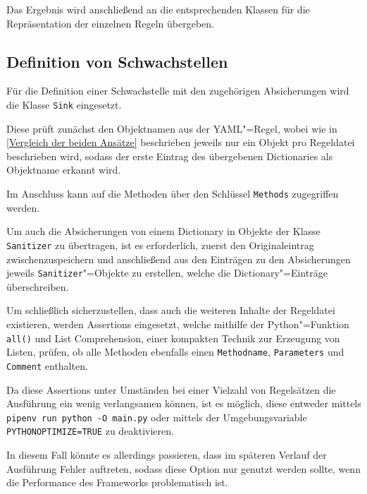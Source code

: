         Das Ergebnis wird anschließend an die entsprechenden Klassen für die Repräsentation der einzelnen Regeln übergeben.

        \subsection{Definition von Schwachstellen}
            Für die Definition einer Schwachstelle mit den zugehörigen Absicherungen wird die Klasse
            \lstinline{Sink} eingesetzt.

            Diese prüft zunächst den Objektnamen aus der
            \gls{YAML}"=Regel,
            wobei wie in
            \vref{Vergleich der beiden Ansätze} beschrieben jeweils nur ein Objekt pro Regeldatei beschrieben wird,
            sodass der erste Eintrag des übergebenen Dictionaries als Objektname erkannt wird.

            Im Anschluss kann auf die Methoden über den Schlüssel
            \lstinline{Methods} zugegriffen werden.

            Um auch die Absicherungen von einem Dictionary in Objekte der Klasse
            \lstinline{Sanitizer} zu übertragen,
            ist es erforderlich,
            zuerst den Originaleintrag zwischenzuspeichern und
            anschließend aus den Einträgen zu den Absicherungen jeweils
            \lstinline{Sanitizer}"=Objekte zu erstellen,
            welche die Dictionary"=Einträge überschreiben.

            Um schließlich sicherzustellen,
            dass auch die weiteren Inhalte der Regeldatei existieren,
            werden Assertions eingesetzt,
            welche mithilfe der Python"=Funktion
            \lstinline{all()} und
            List Comprehension,
            einer kompakten Technik zur Erzeugung von Listen,
            prüfen,
            ob alle Methoden ebenfalls einen
            \lstinline{Methodname},
            \lstinline{Parameters} und
            \lstinline{Comment} enthalten.

            Da diese Assertions unter Umständen bei einer Vielzahl von Regelsätzen die Ausführung ein wenig verlangsamen können,
            ist es möglich,
            diese entweder mittels
            \lstinline{pipenv run python -O main.py} oder
            mittels der Umgebungsvariable
            \lstinline{PYTHONOPTIMIZE=TRUE} zu deaktivieren.

            In diesem Fall könnte es allerdings passieren,
            dass im späteren Verlauf der Ausführung Fehler auftreten,
            sodass diese Option nur genutzt werden sollte,
            wenn die Performance des Frameworks problematisch ist.

